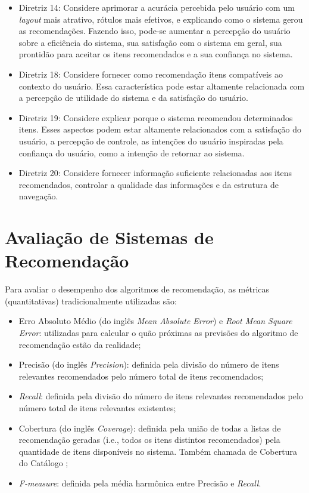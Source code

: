 \begin{itemize}
\item Diretriz 14: Considere aprimorar a acurácia percebida pelo usuário com um \textit{layout} mais atrativo, rótulos mais
efetivos, e explicando como o sistema gerou as recomendações. Fazendo isso, pode-se aumentar a percepção do usuário sobre a
eficiência do sistema, sua satisfação com o sistema em geral, sua prontidão para aceitar os itens recomendados e a sua
confiança no sistema.
\item Diretriz 18: Considere fornecer como recomendação itens compatíveis ao contexto do usuário. Essa característica
pode estar altamente relacionada com a percepção de utilidade do sistema e da satisfação do usuário.
\item Diretriz 19: Considere explicar porque o sistema recomendou determinados itens. Esses aspectos podem estar
altamente relacionados com a satisfação do usuário, a percepção de controle, as intenções do usuário inspiradas pela
confiança do usuário, como a intenção de retornar ao sistema.
\item Diretriz 20: Considere fornecer informação suficiente relacionadas aos itens recomendados, controlar a qualidade
das informações e da estrutura de navegação.
\end{itemize}

\section{Avaliação de Sistemas de Recomendação}\label{section:fundamentacao-avaliacao-sr}

Para avaliar o desempenho dos algoritmos de recomendação, as métricas (quantitativas) tradicionalmente utilizadas são:

\begin{itemize}
\item Erro Absoluto Médio (do inglês \textit{Mean Absolute Error}) e \textit{Root Mean Square Error}: utilizadas
para calcular o quão próximas as previsões do algoritmo de recomendação estão da realidade;
\item Precisão (do inglês \textit{Precision}): definida pela divisão do número de itens relevantes recomendados pelo número total de itens recomendados;
\item \textit{Recall}: definida pela divisão do número de itens relevantes recomendados pelo número total de itens
relevantes existentes;
\item Cobertura (do inglês \textit{Coverage}): definida pela união de todas a listas de recomendação geradas (i.e., todos os itens
distintos recomendados) pela quantidade de itens disponíveis no sistema. Também chamada de Cobertura do Catálogo \cite{ge2010beyond};
\item \textit{F-measure}: definida pela média harmônica entre Precisão e \textit{Recall}.
\end{itemize}

